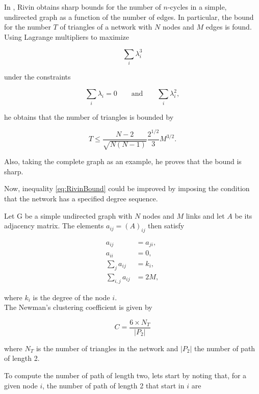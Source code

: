 \documentclass{article}
\begin{document}
In \cite{Rivin2002}, Rivin obtains sharp bounds for the number of $n$-cycles in a simple, undirected graph as a function of the number of edges. In particular, the bound for the number $T$ of triangles of a network with $N$ nodes and $M$ edges is found. Using Lagrange multipliers to maximize 

\begin{equation}
    \sum_i \lambda_i^3
\end{equation}

under the constraints

\begin{equation}
    \sum_i \lambda_i = 0\qquad \text{and} \qquad \sum_i \lambda_i^2,
\end{equation}

he obtains that the number of triangles is bounded by

\begin{equation} \label{eq:RivinBound}
    T \leq \dfrac{N-2}{\sqrt{N (N-1)}} \dfrac{2^{1/2}}{3} M^{3/2}.
\end{equation}

Also, taking the complete graph as an example, he proves that the bound is sharp.

Now, inequality \ref{eq:RivinBound} could be improved by imposing the condition that the network has a specified degree sequence.

Let G be a simple undirected graph with $N$ nodes and $M$ links and let $A$ be its adjacency matrix. The elements $a_{ij}=(A)_{ij}$ then satisfy

\begin{align}
    a_{ij} &= a_{ji}, \\
    a_{ii} &= 0, \\
    \sum_{j} a_{ij} &= k_i, \\
    \sum_{i, j} a_{ij} &= 2M,
\end{align}

where $k_i$ is the degree of the node $i$.
\\

The Newman's clustering coefficient is given by

\begin{equation}
    C = \dfrac{6 \times N_T}{|P_2|} 
\end{equation}

where $N_T$ is the number of triangles in the network and $|P_2|$ the number of path of length 2.

To compute the number of path of length two, lets start by noting that, for a given node $i$, the number of path of length 2 that start in $i$ are
\end{document}
